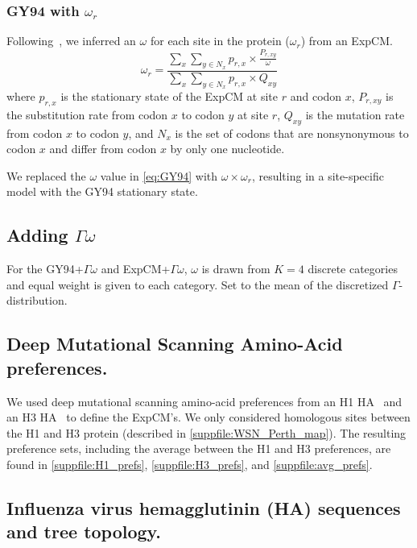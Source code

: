 \documentclass[11pt]{article}
\begin{document}
\subsubsection*{GY94 with $\omega_r$}
Following~\citet{spielman2015relationship}, we inferred an $\omega$ for each site in the protein ($\omega_r$) from an ExpCM. 
\begin{equation}
\label{eq:w_r}
\omega_{r} = \frac{\sum_{x} \sum_{y \in N_x} {p_{r,x} \times \frac{P_{r,xy}}{\omega}}}{\sum_{x} \sum_{y \in N_x} {p_{r,x} \times Q_{xy}}}
\end{equation}
where $p_{r,x}$ is the stationary state of the ExpCM at site $r$ and codon $x$, $P_{r,xy}$ is the substitution rate from codon $x$ to codon $y$ at site $r$, $Q_{xy}$ is the mutation rate from codon $x$ to codon $y$, and $N_x$ is the set of codons that are nonsynonymous to codon $x$ and differ from codon $x$ by only one nucleotide. 

We replaced the $\omega$ value in \ref{eq:GY94} with $\omega \times \omega_r$, resulting in a site-specific model with the GY94 stationary state. 

\subsection*{Adding $\Gamma\omega$}

For the GY94+$\Gamma\omega$ and ExpCM+$\Gamma\omega$, $\omega$ is drawn from $K=4$ discrete categories and equal weight is given to each category. 
Set to the mean of the discretized $\Gamma$-distribution. 

\subsection*{Deep Mutational Scanning Amino-Acid preferences.}
We used deep mutational scanning amino-acid preferences from an H1 HA~\citep{doud2016accurate} and an H3 HA~\citep{lee2018deep} to define the ExpCM's. 
We only considered homologous sites between the H1 and H3 protein (described in \ref{suppfile:WSN_Perth_map}). 
The resulting preference sets, including the average between the H1 and H3 preferences, are found in \ref{suppfile:H1_prefs}, \ref{suppfile:H3_prefs}, and \ref{suppfile:avg_prefs}.

\subsection*{Influenza virus hemagglutinin (HA) sequences and tree topology.}
\end{document}
